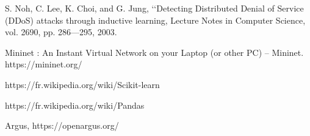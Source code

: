 \begin{thebibliography}{9}
\bibitem{}
S. Noh, C. Lee, K. Choi, and G. Jung, ‘‘Detecting Distributed Denial of Service (DDoS) attacks through inductive learning, Lecture Notes in Computer Science, vol. 2690, pp. 286---295, 2003.

\bibitem{}
Mininet : An Instant Virtual Network on your Laptop (or other PC) – Mininet. https://mininet.org/

\bibitem{}
https://fr.wikipedia.org/wiki/Scikit-learn

\bibitem{}
https://fr.wikipedia.org/wiki/Pandas

\bibitem{}
Argus, https://openargus.org/

\end{thebibliography}